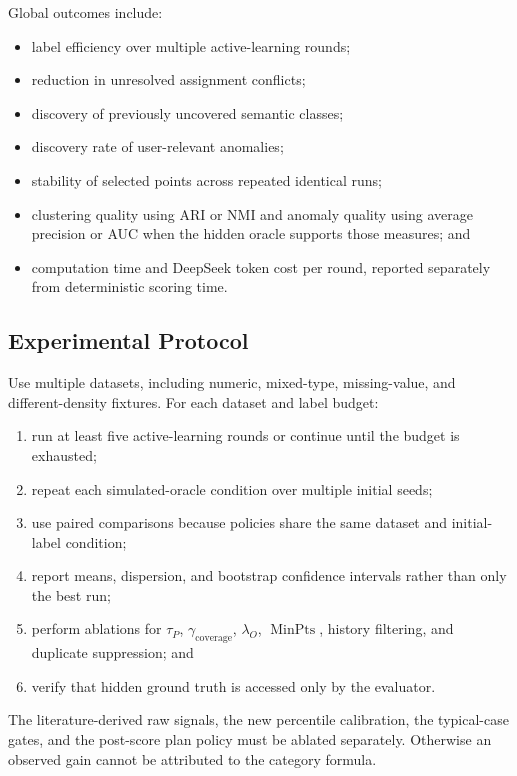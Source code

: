 \documentclass[11pt]{article}
\newcommand{\MinPts}{\operatorname{MinPts}}
\begin{document}
Global outcomes include:
\begin{itemize}[leftmargin=*]
    \item label efficiency over multiple active-learning rounds;
    \item reduction in unresolved assignment conflicts;
    \item discovery of previously uncovered semantic classes;
    \item discovery rate of user-relevant anomalies;
    \item stability of selected points across repeated identical runs;
    \item clustering quality using ARI or NMI and anomaly quality using average
    precision or AUC when the hidden oracle supports those measures; and
    \item computation time and DeepSeek token cost per round, reported
    separately from deterministic scoring time.
\end{itemize}

\subsection{Experimental Protocol}

Use multiple datasets, including numeric, mixed-type, missing-value, and
different-density fixtures. For each dataset and label budget:
\begin{enumerate}[leftmargin=*]
    \item run at least five active-learning rounds or continue until the budget
    is exhausted;
    \item repeat each simulated-oracle condition over multiple initial seeds;
    \item use paired comparisons because policies share the same dataset and
    initial-label condition;
    \item report means, dispersion, and bootstrap confidence intervals rather
    than only the best run;
    \item perform ablations for $\tau_P$, $\gamma_{\mathrm{coverage}}$,
    $\lambda_O$, $\MinPts$, history filtering, and duplicate suppression; and
    \item verify that hidden ground truth is accessed only by the evaluator.
\end{enumerate}

The literature-derived raw signals, the new percentile calibration, the
typical-case gates, and the post-score plan policy must be ablated separately.
Otherwise an observed gain cannot be attributed to the category formula.
\end{document}
